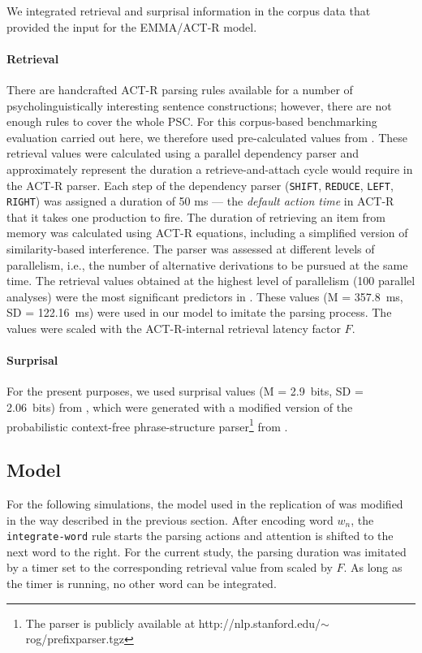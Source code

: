 \documentclass{cambridge7A}\usepackage[]{graphicx}\usepackage[]{color}
\begin{document}
We integrated retrieval and surprisal information in the corpus data that provided the input for the EMMA/ACT-R model.

\paragraph{Retrieval}
There are handcrafted ACT-R parsing rules available for a number of psycholinguistically interesting sentence constructions;  however, there are not enough rules to cover the whole PSC.  For this corpus-based benchmarking evaluation carried out here, we therefore used pre-calculated values from \cite{BostonHaleVasishth2011}.  These retrieval values were calculated using a parallel dependency parser and approximately represent the duration a retrieve-and-attach cycle would require in the ACT-R parser.  Each step of the dependency parser (\texttt{SHIFT}, \texttt{REDUCE}, \texttt{LEFT}, \texttt{RIGHT}) was assigned a duration of 50 ms --- the \emph{default action time} in ACT-R that it takes one production to fire.  The duration of retrieving an item from memory was calculated using ACT-R equations, including a simplified version of similarity-based interference.  The parser was assessed at different levels of parallelism, i.e., the number of alternative derivations to be pursued at the same time.
The retrieval values obtained at the highest level of parallelism (100 parallel analyses) were the most significant predictors in \cite{BostonHaleVasishth2011}.  These values (M = 357.8~ms, SD = 122.16~ms) were used in our model to imitate the parsing process.  The values were scaled with the ACT-R-internal  retrieval latency factor $F$.

\paragraph{Surprisal}
For the present purposes, we used surprisal values (M = 2.9~bits, SD = 2.06~bits) from \cite{jemrsurprisal}, which were generated with a modified version of the probabilistic context-free phrase-structure parser\footnote{The parser is publicly available at http://nlp.stanford.edu/$\sim$rog/prefixparser.tgz} from \cite{Levy2008}.

\subsection{Model}
For the following simulations, the model used in the replication of \cite{Salvucci2001} was modified in the way described in the previous section.  
After encoding word $w_n$, the \texttt{integrate-word} rule starts the parsing actions and attention is shifted to the next word to the right.  For the current study, the parsing duration was imitated by a timer set to the corresponding retrieval value from \cite{jemrsurprisal} scaled by $F$.  As long as the timer is running, no other word can be integrated.
\end{document}
